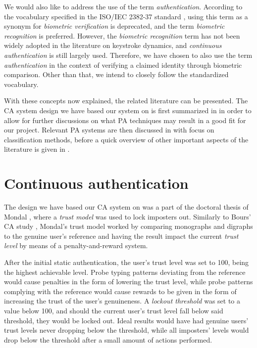We would also like to address the use of the term \textit{authentication}.
According to the vocabulary specified in the ISO/IEC 2382-37 standard \cite{ISO-voc}, using this term as a synonym for \textit{biometric verification} is deprecated, and the term \textit{biometric recognition} is preferred.
However, the \textit{biometric recognition} term has not been widely adopted in the literature on keystroke dynamics, and \textit{continuous authentication} is still largely used.
Therefore, we have chosen to also use the term \textit{authentication} in the context of verifying a claimed identity through biometric comparison.
Other than that, we intend to closely follow the standardized vocabulary.

With these concepts now explained, the related literature can be presented.
The CA system design we have based our system on is first summarized in  in order to allow for further discussions on what PA techniques may result in a good fit for our project.
Relevant PA systems are then discussed in  with focus on classification methods, before a quick overview of other important aspects of the literature is given in .

\section{Continuous authentication}
\label{sec:related-CA}
The design we have based our CA system on was a part of the doctoral thesis of Mondal \cite{mondal}, where a \textit{trust model} was used to lock imposters out.
Similarly to Bours' CA study \cite{BOURS201236}, Mondal's trust model worked by comparing monographs and digraphs to the genuine user's reference and having the result impact the current \textit{trust level} by means of a penalty-and-reward system.

After the initial static authentication, the user's trust level was set to 100, being the highest achievable level.
Probe typing patterns deviating from the reference would cause penalties in the form of lowering the trust level, while probe patterns complying with the reference would cause rewards to be given in the form of increasing the trust of the user's genuineness.
A \textit{lockout threshold} was set to a value below 100, and should the current user's trust level fall below said threshold, they would be locked out.
Ideal results would have had genuine users' trust levels never dropping below the threshold, while all imposters' levels would drop below the threshold after a small amount of actions performed.

